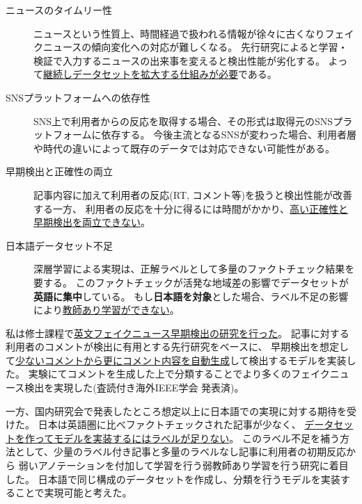 \begin{description}
    \vspace{-5mm}
    \setlength{\parskip}{0cm}
    \setlength{\itemsep}{0cm}
    \item[ニュースのタイムリー性] %
        ニュースという性質上、時間経過で扱われる情報が徐々に古くなりフェイクニュースの傾向変化への対応が難しくなる。
        先行研究によると学習・検証で入力するニュースの出来事を変えると検出性能が劣化する\cite{Wang:2018:EEA:3219819.3219903}。
        よって\underline{継続しデータセットを拡大する仕組みが必要}である。
    \item[SNSプラットフォームへの依存性] %
        SNS上で利用者からの反応を取得する場合、その形式は取得元のSNSプラットフォームに依存する。
        今後主流となるSNSが変わった場合、利用者層や時代の違いによって既存のデータでは対応できない可能性がある。
    \item[早期検出と正確性の両立] %
        記事内容に加えて利用者の反応(RT, コメント等)を扱うと検出性能が改善する\cite{Wu:2018:TFF:3159652.3159677}一方、
        利用者の反応を十分に得るには時間がかかり、\underline{高い正確性と早期検出を両立できない}。
    \item[日本語データセット不足] %
        深層学習による実現は、正解ラベルとして多量のファクトチェック結果を要する。
        このファクトチェックが活発な地域差の影響でデータセットが\textbf{英語に集中}\cite{fakenewsnet}している。
        もし\textbf{日本語を対象}とした場合、ラベル不足の影響により\underline{教師あり学習ができない}。
    \end{description}

私は修士課程で\underline{英文フェイクニュース早期検出の研究を行った}。
記事に対する利用者のコメントが検出に有用とする先行研究をベースに、
早期検出を想定して\underline{少ないコメントから更にコメント内容を自動生成}して検出するモデルを実装した。
実験にてコメントを生成した上で分類することでより多くのフェイクニュース検出を実現した(査読付き海外IEEE学会 発表済\cite{ines})。

一方、国内研究会で発表したところ想定以上に日本語での実現に対する期待を受けた。
日本は英語圏に比べファクトチェックされた記事が少なく、
\underline{データセットを作ってモデルを実装するにはラベルが足りない}。
このラベル不足を補う方法として、少量のラベル付き記事と多量のラベルなし記事に利用者の初期反応から
弱いアノテーションを付加して学習を行う弱教師あり学習を行う研究\cite{mwss}に着目した。
日本語で同じ構成のデータセットを作成し、分類を行うモデルを実装することで実現可能と考えた。

